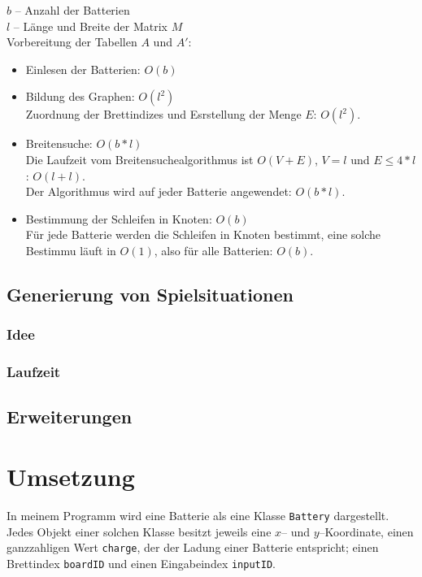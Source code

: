 \documentclass[a4paper,10pt,ngerman]{scrartcl}
\begin{document}
$b$ -- Anzahl der Batterien\\
$l$ -- Länge und Breite der Matrix $M$\\

Vorbereitung der Tabellen $A$ und $A'$:
\begin{itemize}
  \item Einlesen der Batterien: $O(b)$
  \item Bildung des Graphen: $O(l^2)$\\
  Zuordnung der Brettindizes und Esrstellung der Menge $E$: $O(l^2)$.
  \item Breitensuche: $O(b*l)$\\
  Die Laufzeit vom Breitensuchealgorithmus ist $O(V + E)$, $V = l$ und $E \leqslant 4*l$: $O(l+l)$.\\
  Der Algorithmus wird auf jeder Batterie angewendet: $O(b*l)$.
  \item Bestimmung der Schleifen in Knoten: $O(b)$\\
  Für jede Batterie werden die Schleifen in Knoten bestimmt, eine solche Bestimmu läuft in $O(1)$,
  also für alle Batterien: $O(b)$.
\end{itemize}


\subsection{Generierung von Spielsituationen}
\subsubsection{Idee}
\subsubsection{Laufzeit}


\subsection{Erweiterungen}



\newpage
\section{Umsetzung}
In meinem Programm wird eine Batterie als eine Klasse \texttt{Battery} dargestellt.
Jedes Objekt einer solchen Klasse besitzt jeweils eine $x$-- und $y$--Koordinate,
einen ganzzahligen Wert \texttt{charge}, der der Ladung einer Batterie entspricht;
einen Brettindex \texttt{boardID} und einen Eingabeindex \texttt{inputID}.\\
\end{document}
